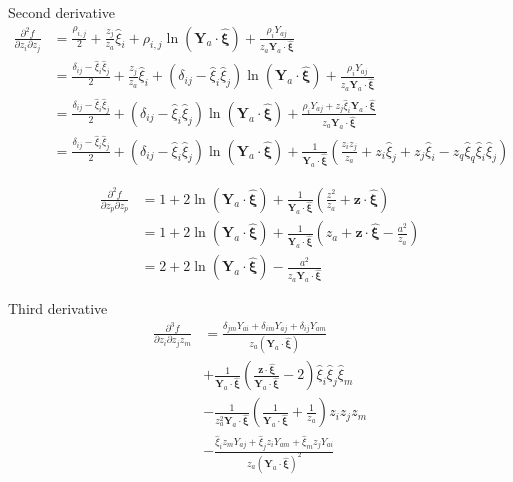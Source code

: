 Second derivative
\begin{align}
\frac{\partial^2 f}{\partial  z_i\partial  z_j}
&=
\frac{\rho_{i,j}}{2}
+\frac{z_j}{z_a}\hat{\xi}_i
+ \rho_{i,j}\ln\left(\bm Y_a \cdot \hat{\bm \xi}\right)
+ \frac{\rho_iY_{aj}}{z_a \bm Y_a \cdot \hat{\bm \xi}}\nonumber\\
%
&=
\frac{ \delta_{ij}-\hat{\xi}_i\hat{\xi}_j}{2}
+\frac{z_j}{z_a}\hat{\xi}_i
+ (\delta_{ij}-\hat{\xi}_i\hat{\xi}_j)\ln\left(\bm Y_a \cdot \hat{\bm \xi}\right)
+ \frac{\rho_iY_{aj}}{z_a \bm Y_a \cdot \hat{\bm \xi}}\nonumber\\
&=
\frac{ \delta_{ij}-\hat{\xi}_i\hat{\xi}_j}{2}
+ (\delta_{ij}-\hat{\xi}_i\hat{\xi}_j)\ln\left(\bm Y_a \cdot \hat{\bm \xi}\right)
+ \frac{\rho_iY_{aj}+z_j\hat{\xi}_i \bm Y_a \cdot \hat{\bm \xi}}{z_a \bm Y_a \cdot \hat{\bm \xi}}
\nonumber\\
&=
\frac{ \delta_{ij}-\hat{\xi}_i\hat{\xi}_j}{2}
+ (\delta_{ij}-\hat{\xi}_i\hat{\xi}_j)\ln\left(\bm Y_a \cdot \hat{\bm \xi}\right)
+ \frac{1}{ \bm Y_a \cdot \hat{\bm \xi}}\left(\frac{z_iz_j}{z_a}+z_i\hat{\xi}_j+z_j\hat{\xi}_i-z_q\hat{\xi}_q\hat{\xi}_i\hat{\xi}_j\right)
\end{align}

\begin{align}
\frac{\partial^2 f}{\partial  z_p\partial  z_p}
&=1+ 2\ln\left(\bm Y_a \cdot \hat{\bm \xi}\right)+ \frac{1}{ \bm Y_a \cdot \hat{\bm \xi}}\left(\frac{z^2}{z_a}+\bm z\cdot\hat{\bm\xi}\right)\nonumber\\
&=1+ 2\ln\left(\bm Y_a \cdot \hat{\bm \xi}\right)+ \frac{1}{ \bm Y_a \cdot \hat{\bm \xi}}\left(z_a+\bm z\cdot\hat{\bm\xi}-\frac{a^2}{z_a}\right)\nonumber\\
&=2+ 2\ln\left(\bm Y_a \cdot \hat{\bm \xi}\right)-\frac{a^2}{z_a \bm Y_a \cdot \hat{\bm \xi}}
\label{laplacianFz}
\end{align}

Third derivative
\begin{align}
\frac{\partial^3 f}{\partial  z_i\partial  z_j z_m}
&=\frac{\delta_{jm}Y_{ai}+\delta_{im}Y_{aj}+\delta_{ij}Y_{am}}{z_a(\bm Y_a\cdot \hat{\bm \xi})}\\
&+\frac{1}{\bm Y_a\cdot \hat{\bm \xi}}\left(\frac{\bm z\cdot{\hat{\bm \xi}}}{\bm Y_a\cdot \hat{\bm \xi}}-2\right)\hat{\xi}_i\hat{\xi}_j\hat{\xi}_m\\
&-\frac{1}{z_a^2\bm Y_a\cdot \hat{\bm \xi}}\left(\frac{1}{\bm Y_a\cdot \hat{\bm \xi}}+\frac{1}{z_a}\right)z_iz_jz_m\\
&-\frac{\hat{\xi}_iz_mY_{aj}+\hat{\xi}_jz_iY_{am}+\hat{\xi}_mz_jY_{ai}}{z_a(\bm Y_a\cdot \hat{\bm \xi})^2}\\
\end{align}

